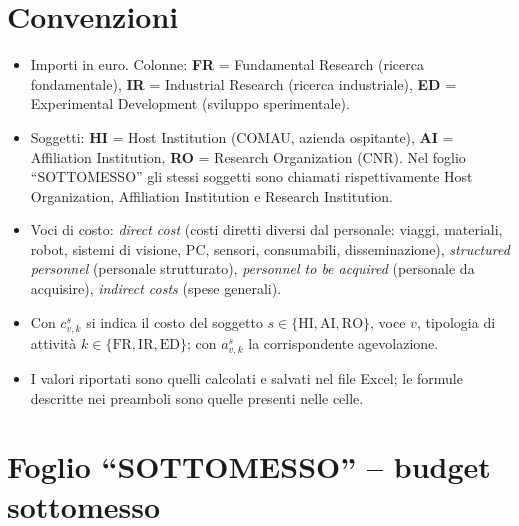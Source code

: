 \documentclass{plan4ari_report}
\newcommand{\FR}{\mathrm{FR}}
\newcommand{\IR}{\mathrm{IR}}
\newcommand{\ED}{\mathrm{ED}}
\begin{document}
\section*{Convenzioni}
\begin{itemize}
  \item Importi in euro. Colonne: \textbf{FR} = Fundamental Research (ricerca fondamentale), \textbf{IR} = Industrial Research (ricerca industriale), \textbf{ED} = Experimental Development (sviluppo sperimentale).
  \item Soggetti: \textbf{HI} = Host Institution (COMAU, azienda ospitante), \textbf{AI} = Affiliation Institution, \textbf{RO} = Research Organization (CNR). Nel foglio ``SOTTOMESSO'' gli stessi soggetti sono chiamati rispettivamente Host Organization, Affiliation Institution e Research Institution.
  \item Voci di costo: \emph{direct cost} (costi diretti diversi dal personale: viaggi, materiali, robot, sistemi di visione, PC, sensori, consumabili, disseminazione), \emph{structured personnel} (personale strutturato), \emph{personnel to be acquired} (personale da acquisire), \emph{indirect costs} (spese generali).
  \item Con $c^{s}_{v,k}$ si indica il costo del soggetto $s\in\{\mathrm{HI},\mathrm{AI},\mathrm{RO}\}$, voce $v$, tipologia di attivit\`a $k\in\{\FR,\IR,\ED\}$; con $a^{s}_{v,k}$ la corrispondente agevolazione.
  \item I valori riportati sono quelli calcolati e salvati nel file Excel; le formule descritte nei preamboli sono quelle presenti nelle celle.
\end{itemize}

\section{Foglio ``SOTTOMESSO'' -- budget sottomesso}
\end{document}
